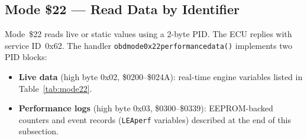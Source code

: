 \documentclass[a4paper,11pt]{article}
\renewcommand{\_}{\oldunderscore\allowbreak}
\begin{document}
\newpage
\subsection{Mode \$22 --- Read Data by Identifier}

Mode~\$22 reads live or static values using a 2-byte PID. The ECU replies with
service ID~0x62. The handler \texttt{obd\_mode\_0x22\_performance\_data()}
implements two PID blocks:

\begin{itemize}
\item \textbf{Live data} (high byte 0x02, \$0200--\$024A): real-time engine
      variables listed in Table~\ref{tab:mode22}.
\item \textbf{Performance logs} (high byte 0x03, \$0300--\$0339):
      EEPROM-backed counters and event records (\texttt{LEA\_perf\_*}
      variables) described at the end of this subsection.
\end{itemize}
\end{document}
